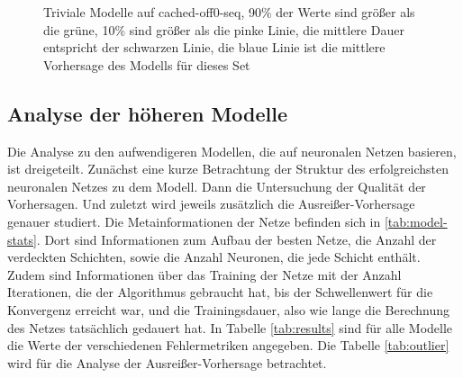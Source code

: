 \documentclass[
	12pt,
	a4paper,
	BCOR10mm,
	DIV14,
	listof=totoc,
	bibliography=totoc,
	headsepline
]{scrreprt}
\begin{document}
\begin{figure}
 	\caption{Triviale Modelle auf cached-off0-seq, 90\% der Werte sind größer als die grüne, 10\% sind größer als die pinke Linie, die mittlere Dauer entspricht der schwarzen Linie, die blaue Linie ist die mittlere Vorhersage des Modells für dieses Set}
 	\label{fig:densities_baselines_seq}
 \end{figure} 

\clearpage

\subsection{Analyse der höheren Modelle}

Die Analyse zu den aufwendigeren Modellen, die auf neuronalen Netzen basieren, ist dreigeteilt. 
Zunächst eine kurze Betrachtung der Struktur des erfolgreichsten neuronalen Netzes zu dem Modell. 
Dann die Untersuchung der Qualität der Vorhersagen.
Und zuletzt wird jeweils zusätzlich die Ausreißer-Vorhersage genauer studiert.
Die Metainformationen der Netze befinden sich in \ref{tab:model-stats}. Dort sind Informationen zum Aufbau der besten Netze, die Anzahl der verdeckten Schichten, sowie die Anzahl Neuronen, die jede Schicht enthält. Zudem sind Informationen über das Training der Netze mit der Anzahl Iterationen, die der Algorithmus gebraucht hat, bis der Schwellenwert für die Konvergenz erreicht war, und die Trainingsdauer, also wie lange die Berechnung des Netzes tatsächlich gedauert hat.
In Tabelle \ref{tab:results} sind für alle Modelle die Werte der verschiedenen Fehlermetriken angegeben.
Die Tabelle \ref{tab:outlier} wird für die Analyse der Ausreißer-Vorhersage betrachtet.
\end{document}
